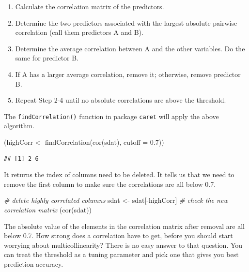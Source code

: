 \documentclass[
  12pt,
]{krantz}
\makeatletter
\newenvironment{Shaded}{\begin{snugshade}}{\end{snugshade}}
\newcommand{\AttributeTok}[1]{\textcolor[rgb]{0.61,0.61,0.61}{#1}}
\newcommand{\CommentTok}[1]{\textcolor[rgb]{0.37,0.37,0.37}{\textit{#1}}}
\newcommand{\FloatTok}[1]{\textcolor[rgb]{0.06,0.06,0.06}{#1}}
\newcommand{\FunctionTok}[1]{\textcolor[rgb]{0,0,0}{#1}}
\newcommand{\NormalTok}[1]{#1}
\newcommand{\OtherTok}[1]{\textcolor[rgb]{0.37,0.37,0.37}{#1}}
\newcommand{\SpecialCharTok}[1]{\textcolor[rgb]{0,0,0}{#1}}
\providecommand{\tightlist}{%
  \setlength{\itemsep}{0pt}\setlength{\parskip}{0pt}}
\renewenvironment{quote}{\begin{VF}}{\end{VF}}
\newenvironment{kframe}{%
\medskip{}
\setlength{\fboxsep}{.8em}
 \def\at@end@of@kframe{}%
 \ifinner\ifhmode%
  \def\at@end@of@kframe{\end{minipage}}%
  \begin{minipage}{\columnwidth}%
 \fi\fi%
 \def\FrameCommand##1{\hskip\@totalleftmargin \hskip-\fboxsep
 \colorbox{shadecolor}{##1}\hskip-\fboxsep
     \hskip-\linewidth \hskip-\@totalleftmargin \hskip\columnwidth}%
 \MakeFramed {\advance\hsize-\width
   \@totalleftmargin\z@ \linewidth\hsize
   \@setminipage}}%
 {\par\unskip\endMakeFramed%
 \at@end@of@kframe}
\renewenvironment{Shaded}{\begin{kframe}}{\end{kframe}}
\makeatother
\begin{document}
\begin{quote}
\begin{enumerate}
\def\labelenumi{(\arabic{enumi})}
\tightlist
\item
  Calculate the correlation matrix of the predictors.
\item
  Determine the two predictors associated with the largest absolute pairwise correlation (call them predictors A and B).
\item
  Determine the average correlation between A and the other variables. Do the same for predictor B.
\item
  If A has a larger average correlation, remove it; otherwise, remove predictor B.
\item
  Repeat Step 2-4 until no absolute correlations are above the threshold.
\end{enumerate}
\end{quote}

The \texttt{findCorrelation()} function in package \texttt{caret} will apply the above algorithm.

\begin{Shaded}
\begin{Highlighting}[]
\NormalTok{(highCorr }\OtherTok{\textless{}{-}} \FunctionTok{findCorrelation}\NormalTok{(}\FunctionTok{cor}\NormalTok{(sdat), }\AttributeTok{cutoff =} \FloatTok{0.7}\NormalTok{))}
\end{Highlighting}
\end{Shaded}

\begin{verbatim}
## [1] 2 6
\end{verbatim}

It returns the index of columns need to be deleted. It tells us that we need to remove the first column to make sure the correlations are all below 0.7.

\begin{Shaded}
\begin{Highlighting}[]
\CommentTok{\# delete highly correlated columns}
\NormalTok{sdat }\OtherTok{\textless{}{-}}\NormalTok{ sdat[}\SpecialCharTok{{-}}\NormalTok{highCorr]}
\CommentTok{\# check the new correlation matrix}
\NormalTok{(}\FunctionTok{cor}\NormalTok{(sdat))}
\end{Highlighting}
\end{Shaded}

The absolute value of the elements in the correlation matrix after removal are all below 0.7. How strong does a correlation have to get, before you should start worrying about multicollinearity? There is no easy answer to that question. You can treat the threshold as a tuning parameter and pick one that gives you best prediction accuracy.
\end{document}
